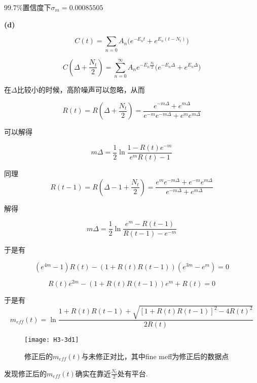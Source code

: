 \documentclass[UTF8]{ctexart}
\begin{document}
$99.7\%$置信度下$\sigma_m=0.00085505$

\noindent\textbf{(d)}

\begin{equation}\label{3-d-1}
    C(t)=\sum_{n=0} A_n\Big(e^{-E_nt}+e^{E_n(t-N_t)}\Big)
\end{equation}

\begin{equation}\label{3-d-2}
    C(\Delta+\frac{N_t}{2})=\sum_{n=0}^\infty A_ne^{-E_n\frac{N_t}{2}}\Big(e^{-E_n\Delta}+e^{E_n\Delta}\Big)
\end{equation}

在$\Delta$比较小的时候，高阶噪声可以忽略，从而

\begin{equation}\label{3-d-3}
    R(t)=R(\Delta+\frac{N_t}{2})=\frac{e^{-m\Delta}+e^{m\Delta}}{e^{-m}e^{-m\Delta}+e^me^{m\Delta}}
\end{equation}

可以解得

\begin{equation}\label{3-d-4}
    m\Delta=\frac{1}{2}\ln\frac{1-R(t)e^{-m}}{e^{m}R(t)-1}
\end{equation}

同理
\begin{equation}\label{3-d-5}
    R(t-1)=R(\Delta-1+\frac{N_t}{2})=\frac{e^me^{-m\Delta}+e^{-m}e^{m\Delta}}{e^{-m\Delta}+e^{m\Delta}}
\end{equation}

解得

\begin{equation}\label{3-d-6}
    m\Delta=\frac{1}{2}\ln\frac{e^{m}-R(t-1)}{R(t-1)-e^{-m}}
\end{equation}

于是有

\begin{equation}\label{3-d-7}
    (e^{4m}-1)R(t)-(1+R(t)R(t-1))(e^{3m}-e^{m})=0
\end{equation}

\begin{equation}\label{3-d-8}
    R(t)e^{2m}-(1+R(t)R(t-1))e^{m}+R(t)=0
\end{equation}

于是有
\begin{equation}\label{3-d-9}
    m_{eff}(t)=\ln\frac{1+R(t)R(t-1)+\sqrt{[1+R(t)R(t-1)]^2-4R(t)^2}}{2R(t)}
\end{equation}

\begin{figure}[H]
    \centering
    \texttt{[image: H3-3d1]}
    \caption{修正后的$m_{eff}(t)$与未修正对比，其中fine meff为修正后的数据点}
\end{figure}

发现修正后的$m_{eff}(t)$确实在靠近$\frac{N_t}{2}$处有平台.
\end{document}
